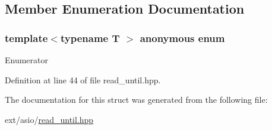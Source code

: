 \subsection{Member Enumeration Documentation}
\hypertarget{structasio_1_1detail_1_1has__result__type_a23e57c0d4061f1da9c5947d355433ab7}{}\subsubsection[{anonymous enum}]{\setlength{\rightskip}{0pt plus 5cm}template$<$typename T $>$ anonymous enum}\label{structasio_1_1detail_1_1has__result__type_a23e57c0d4061f1da9c5947d355433ab7}
\begin{Desc}
\item[Enumerator]\par
\begin{description}
\item[{\em 
\hypertarget{structasio_1_1detail_1_1has__result__type_a23e57c0d4061f1da9c5947d355433ab7ab080d849fcb6f2a567e83684083ed8f2}{}value\label{structasio_1_1detail_1_1has__result__type_a23e57c0d4061f1da9c5947d355433ab7ab080d849fcb6f2a567e83684083ed8f2}
}]\end{description}
\end{Desc}


Definition at line 44 of file read\+\_\+until.\+hpp.



The documentation for this struct was generated from the following file\+:\begin{DoxyCompactItemize}
\item 
ext/asio/\hyperlink{read__until_8hpp}{read\+\_\+until.\+hpp}\end{DoxyCompactItemize}
